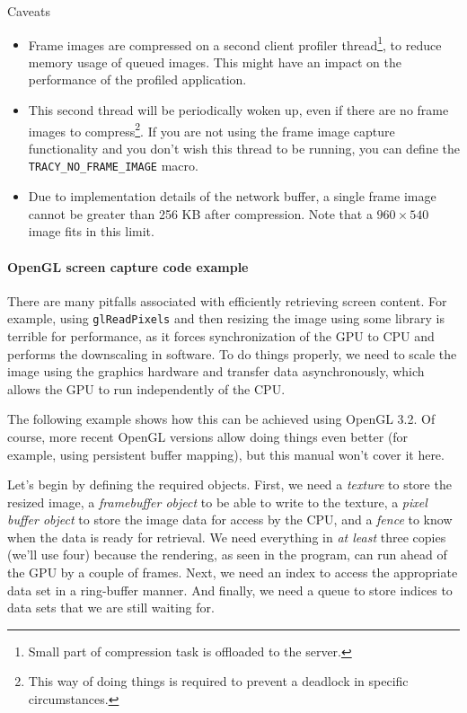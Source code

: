 \documentclass[hidelinks,titlepage,a4paper,twoside]{article}
\begin{document}
\begin{bclogo}[
noborder=true,
couleur=black!5,
logo=\bcattention
]{Caveats}
\begin{itemize}
\item Frame images are compressed on a second client profiler thread\footnote{Small part of compression task is offloaded to the server.}, to reduce memory usage of queued images. This might have an impact on the performance of the profiled application.
\item This second thread will be periodically woken up, even if there are no frame images to compress\footnote{This way of doing things is required to prevent a deadlock in specific circumstances.}. If you are not using the frame image capture functionality and you don't wish this thread to be running, you can define the \texttt{TRACY\_NO\_FRAME\_IMAGE} macro.
\item Due to implementation details of the network buffer, a single frame image cannot be greater than 256 KB after compression. Note that a $960\times540$ image fits in this limit.
\end{itemize}
\end{bclogo}

\paragraph{OpenGL screen capture code example}
\label{screenshotcode}

There are many pitfalls associated with efficiently retrieving screen content. For example, using \texttt{glReadPixels} and then resizing the image using some library is terrible for performance, as it forces synchronization of the GPU to CPU and performs the downscaling in software. To do things properly, we need to scale the image using the graphics hardware and transfer data asynchronously, which allows the GPU to run independently of the CPU.

The following example shows how this can be achieved using OpenGL 3.2. Of course, more recent OpenGL versions allow doing things even better (for example, using persistent buffer mapping), but this manual won't cover it here.

Let's begin by defining the required objects. First, we need a \emph{texture} to store the resized image, a \emph{framebuffer object} to be able to write to the texture, a \emph{pixel buffer object} to store the image data for access by the CPU, and a \emph{fence} to know when the data is ready for retrieval. We need everything in \emph{at least} three copies (we'll use four) because the rendering, as seen in the program, can run ahead of the GPU by a couple of frames. Next, we need an index to access the appropriate data set in a ring-buffer manner. And finally, we need a queue to store indices to data sets that we are still waiting for.
\end{document}
